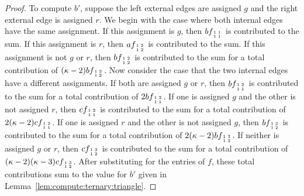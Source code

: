\documentclass[11pt]{article}
\newcommand{\subMat}[4]{\mbox{\scriptsize $\begin{smallmatrix} #1 & #4 \\ #2 & #3 \end{smallmatrix}$}}
\begin{document}
\begin{proof}
 To compute $b'$,
 suppose the left external edges are assigned $g$ and the right external edge is assigned $r$.
 We begin with the case where both internal edges have the same assignment.
 If this assignment is $g$,
 then $b f_{\subMat{1}{1}{1}{1}}$ is contributed to the sum.
 If this assignment is $r$,
 then $a f_{\subMat{1}{1}{2}{2}}$ is contributed to the sum.
 If this assignment is not $g$ or $r$,
 then $b f_{\subMat{1}{1}{2}{2}}$ is contributed to the sum
 for a total contribution of $(\kappa - 2) b f_{\subMat{1}{1}{2}{2}}$.
 Now consider the case that the two internal edges have a different assignments.
 If both are assigned $g$ or $r$,
 then $b f_{\subMat{1}{1}{1}{2}}$ is contributed to the sum
 for a total contribution of $2 b f_{\subMat{1}{1}{1}{2}}$.
 If one is assigned $g$ and the other is not assigned $r$,
 then $c f_{\subMat{1}{1}{1}{2}}$ is contributed to the sum
 for a total contribution of $2 (\kappa - 2) c f_{\subMat{1}{1}{1}{2}}$.
 If one is assigned $r$ and the other is not assigned $g$,
 then $b f_{\subMat{1}{1}{2}{3}}$ is contributed to the sum
 for a total contribution of $2 (\kappa - 2) b f_{\subMat{1}{1}{2}{3}}$.
 If neither is assigned $g$ or $r$,
 then $c f_{\subMat{1}{1}{2}{3}}$ is contributed to the sum
 for a total contribution of $(\kappa - 2) (\kappa - 3) c f_{\subMat{1}{1}{2}{3}}$.
 After substituting for the entries of $f$,
 these total contributions sum to the value for $b'$ given in Lemma~\ref{lem:compute:ternary:triangle}.
 

\end{proof}
\end{document}
